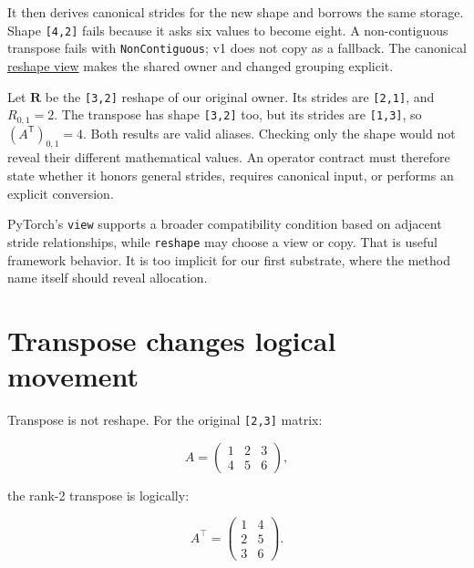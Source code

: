 It then derives canonical strides for the new shape and borrows the same
storage. Shape \texttt{{[}4,2{]}} fails because it asks six values to
become eight. A non-contiguous transpose fails with
\texttt{NonContiguous}; v1 does not copy as a fallback. The canonical
\href{https://github.com/hermonai/inside-the-llm-engine/blob/astra-visual-rewrite/diagrams/tensor/reshape-view.txt}{reshape
view} makes the shared owner and changed grouping explicit.


Let \(\mathbf{R}\) be the \texttt{{[}3,2{]}} reshape of our original
owner. Its strides are \texttt{{[}2,1{]}}, and \(R_{0,1}=2\). The
transpose has shape \texttt{{[}3,2{]}} too, but its strides are
\texttt{{[}1,3{]}}, so \((A^{\mathsf T})_{0,1}=4\). Both results are
valid aliases. Checking only the shape would not reveal their different
mathematical values. An operator contract must therefore state whether
it honors general strides, requires canonical input, or performs an
explicit conversion.

PyTorch's \texttt{view} supports a broader compatibility condition based
on adjacent stride relationships, while \texttt{reshape} may choose a
view or copy. That is useful framework behavior. It is too implicit for
our first substrate, where the method name itself should reveal
allocation.

\section{Transpose changes logical
movement}\label{transpose-changes-logical-movement}

Transpose is not reshape. For the original \texttt{{[}2,3{]}} matrix:

\begin{equation}A=\begin{pmatrix}1&2&3\\4&5&6\end{pmatrix},\end{equation}

the rank-2 transpose is logically:

\begin{equation}A^\top=\begin{pmatrix}1&4\\2&5\\3&6\end{pmatrix}.\end{equation}

